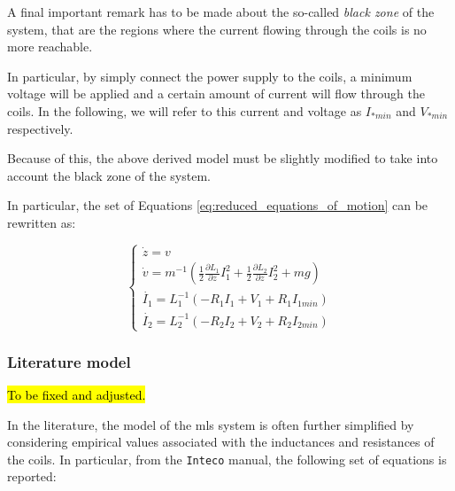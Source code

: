 A final important remark has to be made about the so-called \textit{black zone} of the system, that are the regions where the current flowing through the coils is no more reachable.

In particular, by simply connect the power supply to the coils, a minimum voltage will be applied and a certain amount of current will flow through the coils.
In the following, we will refer to this current and voltage as $I_{*min}$ and $V_{*min}$ respectively.

Because of this, the above derived model must be slightly modified to take into account the black zone of the system.

In particular, the set of Equations \ref{eq:reduced_equations_of_motion} can be rewritten as:

\begin{equation}
    \begin{cases}
        \dot{z} = v                                                                                                                                 \\
        \dot{v} = m^{-1} \left(\frac{1}{2} \frac{\partial L_1}{\partial z} I_1^2 + \frac{1}{2} \frac{\partial L_2}{\partial z} I_2^2 + m g  \right) \\
        \dot{I_1} = L_1^{-1} \left(- R_1 I_1 + V_1 + R_1 I_{1min} \right)                                                                           \\
        \dot{I_2} = L_2^{-1} \left(- R_2 I_2 + V_2 + R_2 I_{2min} \right)
    \end{cases}
    \label{eq:reduced_equations_of_motion_final}
\end{equation}


\subsubsection{Literature model}
\label{subsubsec:literature_model}

\hl{To be fixed and adjusted.}

In the literature, the model of the \acrshort{mls} system is often further simplified by considering empirical values associated with the inductances and resistances of the coils.
In particular, from the \texttt{Inteco} manual, the following set of equations is reported:


